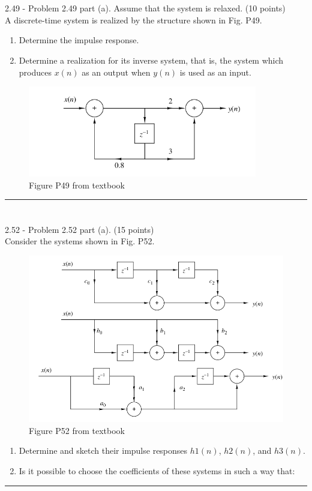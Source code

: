 \documentclass[a4paper, 11pt]{exam}
\begin{document}
\section{}
2.49 - Problem 2.49 part (a). Assume that the system is relaxed. (10 points)\\
A discrete-time system is realized by the structure shown in Fig. P49.\\
\begin{enumerate}
\item Determine the impulse response.
\item Determine a realization for its inverse system, that is, the system which produces $x(n)$ as an output when $y(n)$ is used as an input.
\end{enumerate}
\begin{figure}[ht!]
  \centering
  \includegraphics[width=10cm]{figures/fig49.png}
  \caption{Figure P49 from textbook}
    \label{fig:number49_fromText}
\end{figure}
\vspace{2em}
\hrule
\newpage
\section{}
2.52 - Problem 2.52 part (a). (15 points)\\
Consider the systems shown in Fig. P52.\\
\begin{figure}[ht!]
  \centering
  \includegraphics[width=14cm]{figures/fig52.png}
  \caption{Figure P52 from textbook}
    \label{fig:number52_fromText}
\end{figure}
\begin{enumerate}
\item Determine and sketch their impulse responses $h1 (n)$, $h2 (n)$, and $h3 (n)$.
\item Is it possible to choose the coefficients of these systems in such a way that: 
\end{enumerate}
\vspace{2em}
\hrule
\end{document}
